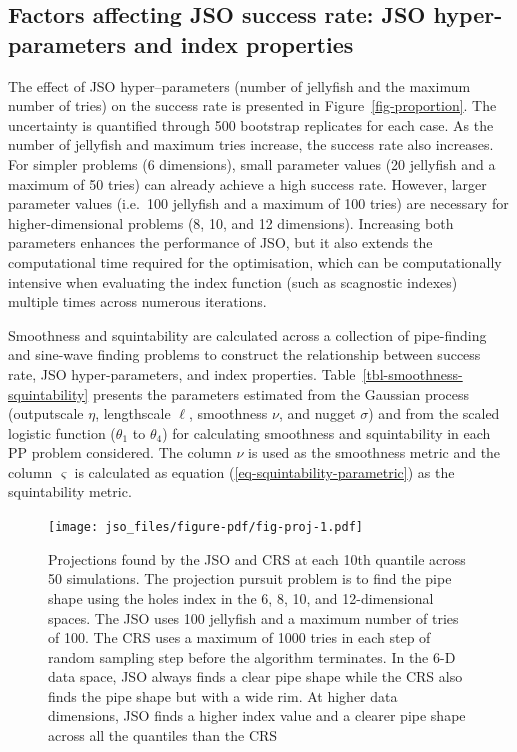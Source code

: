 \documentclass[
  12pt,
]{interact}
\theoremstyle{plain}
\begin{document}
\hypertarget{factors-affecting-jso-success-rate-jso-hyper-parameters-and-index-properties}{%
\subsection{Factors affecting JSO success rate: JSO hyper-parameters and
index
properties}\label{factors-affecting-jso-success-rate-jso-hyper-parameters-and-index-properties}}

The effect of JSO hyper--parameters (number of jellyfish and the maximum
number of tries) on the success rate is presented in
Figure~\ref{fig-proportion}. The uncertainty is quantified through 500
bootstrap replicates for each case. As the number of jellyfish and
maximum tries increase, the success rate also increases. For simpler
problems (6 dimensions), small parameter values (20 jellyfish and a
maximum of 50 tries) can already achieve a high success rate. However,
larger parameter values (i.e.~100 jellyfish and a maximum of 100 tries)
are necessary for higher-dimensional problems (8, 10, and 12
dimensions). Increasing both parameters enhances the performance of JSO,
but it also extends the computational time required for the
optimisation, which can be computationally intensive when evaluating the
index function (such as scagnostic indexes) multiple times across
numerous iterations.

Smoothness and squintability are calculated across a collection of
pipe-finding and sine-wave finding problems to construct the
relationship between success rate, JSO hyper-parameters, and index
properties. Table~\ref{tbl-smoothness-squintability} presents the
parameters estimated from the Gaussian process (outputscale \(\eta\),
lengthscale \(\ell\), smoothness \(\nu\), and nugget \(\sigma\)) and
from the scaled logistic function (\(\theta_1\) to \(\theta_4\)) for
calculating smoothness and squintability in each PP problem considered.
The column \(\nu\) is used as the smoothness metric and the column
\(\varsigma\) is calculated as equation
(\ref{eq-squintability-parametric}) as the squintability metric.

\begin{figure}

{\centering \texttt{[image: jso\_files/figure-pdf/fig-proj-1.pdf]}

}

\caption{\label{fig-proj}Projections found by the JSO and CRS at each
10th quantile across 50 simulations. The projection pursuit problem is
to find the pipe shape using the holes index in the 6, 8, 10, and
12-dimensional spaces. The JSO uses 100 jellyfish and a maximum number
of tries of 100. The CRS uses a maximum of 1000 tries in each step of
random sampling step before the algorithm terminates. In the 6-D data
space, JSO always finds a clear pipe shape while the CRS also finds the
pipe shape but with a wide rim. At higher data dimensions, JSO finds a
higher index value and a clearer pipe shape across all the quantiles
than the CRS}

\end{figure}
\end{document}

